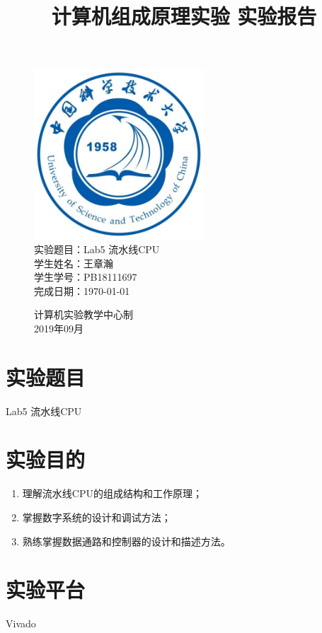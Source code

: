 \documentclass[UTF8]{article}
\title{计算机组成原理实验 实验报告}
\date{}
\begin{document}
\maketitle
\begin{figure}[H]
	\centering
	\includegraphics[width=2.5in]{xiaohui.png}\vspace{0.5cm}\\
	\large{
		实验题目：Lab5 流水线CPU\\
		学生姓名：王章瀚\\
		学生学号：PB18111697\\
		完成日期：\today\\
	}\vspace{2cm}
	
	\large{计算机实验教学中心制\\2019年09月\\}
	\thispagestyle{empty}
	\clearpage  %
\end{figure}
\newpage

\section{实验题目}
Lab5 流水线CPU

\section{实验目的}
\begin{enumerate}
	\item 理解流水线CPU的组成结构和工作原理；
	\item 掌握数字系统的设计和调试方法；
	\item 熟练掌握数据通路和控制器的设计和描述方法。
\end{enumerate}

\section{实验平台}
Vivado
\end{document}

